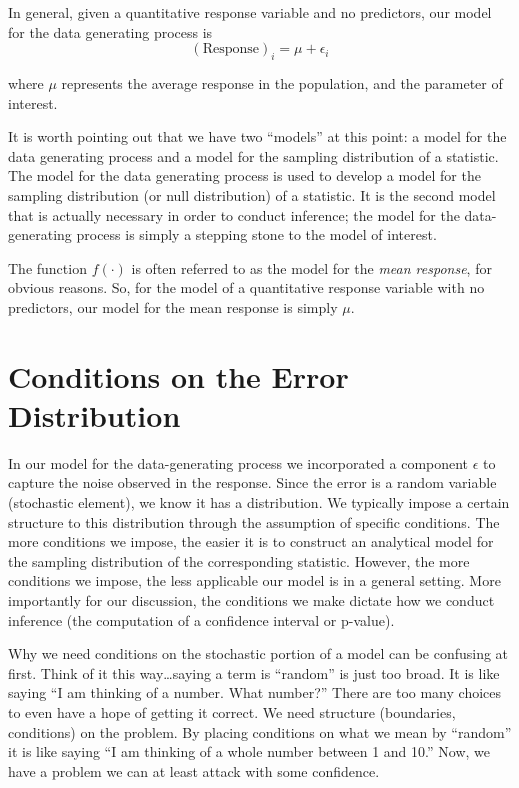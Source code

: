 \documentclass[]{book}
\theoremstyle{plain}
\theoremstyle{mydefn}
\theoremstyle{myexmpl}
\theoremstyle{remark}
\let\BeginKnitrBlock\begin \let\EndKnitrBlock\end
\let\BeginKnitrBlock\begin \let\EndKnitrBlock\end
\begin{document}
\BeginKnitrBlock{rmdtip}
In general, given a quantitative response variable and no predictors,
our model for the data generating process is
\[(\text{Response})_i = \mu + \epsilon_i\]

where \(\mu\) represents the average response in the population, and the
parameter of interest.
\EndKnitrBlock{rmdtip}

It is worth pointing out that we have two ``models'' at this point: a
model for the data generating process and a model for the sampling
distribution of a statistic. The model for the data generating process
is used to develop a model for the sampling distribution (or null
distribution) of a statistic. It is the second model that is actually
necessary in order to conduct inference; the model for the
data-generating process is simply a stepping stone to the model of
interest.

\BeginKnitrBlock{rmdtip}
The function \(f(\cdot)\) is often referred to as the model for the
\emph{mean response}, for obvious reasons. So, for the model of a
quantitative response variable with no predictors, our model for the
mean response is simply \(\mu\).
\EndKnitrBlock{rmdtip}

\section{Conditions on the Error
Distribution}\label{conditions-on-the-error-distribution}

In our model for the data-generating process we incorporated a component
\(\epsilon\) to capture the noise observed in the response. Since the
error is a random variable (stochastic element), we know it has a
distribution. We typically impose a certain structure to this
distribution through the assumption of specific conditions. The more
conditions we impose, the easier it is to construct an analytical model
for the sampling distribution of the corresponding statistic. However,
the more conditions we impose, the less applicable our model is in a
general setting. More importantly for our discussion, the conditions we
make dictate how we conduct inference (the computation of a confidence
interval or p-value).

\BeginKnitrBlock{rmdtip}
Why we need conditions on the stochastic portion of a model can be
confusing at first. Think of it this way\ldots{}saying a term is
``random'' is just too broad. It is like saying ``I am thinking of a
number. What number?'' There are too many choices to even have a hope of
getting it correct. We need structure (boundaries, conditions) on the
problem. By placing conditions on what we mean by ``random'' it is like
saying ``I am thinking of a whole number between 1 and 10.'' Now, we
have a problem we can at least attack with some confidence.
\EndKnitrBlock{rmdtip}
\end{document}
